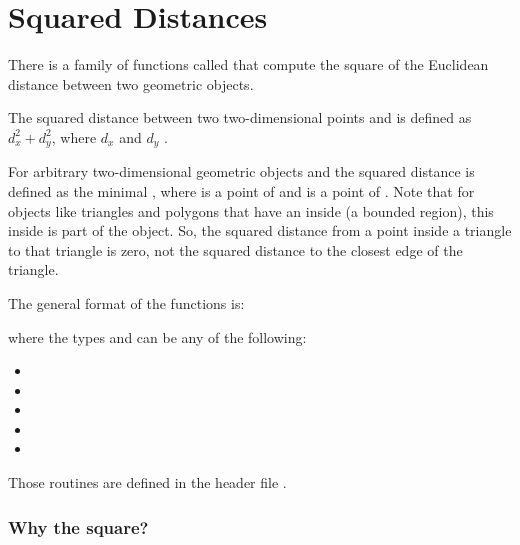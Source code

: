 
\cleardoublepage
\chapter{Squared Distances}

There is a family of functions called  that
compute the square of the Euclidean distance between two geometric objects.

The squared distance between two two-dimensional points  and
 is defined as $d_{x}^{2} + d_{y}^{2}$, where $d_{x}$
\ccTexHtml{$\equiv$}{==}
 and $d_{y}$\ccTexHtml{$\equiv$}{==} .

For arbitrary two-dimensional geometric objects  and
 the squared distance is defined as the minimal
, where  is a point of
 and  is a point of .
Note that for objects like triangles and polygons that have an inside (a
bounded region), this inside is part of the object.
So, the squared distance from a point inside a triangle to that triangle is
zero, not the squared distance to the closest edge of the triangle.

The general format of the functions is:


\noindent
where the types  and  can be any of the
following:
\begin{itemize}
\item {}
\item {}
\item {}
\item {}
\item {}
\end{itemize}

Those routines are defined in the header file
.

\subsection{Why the square?}

